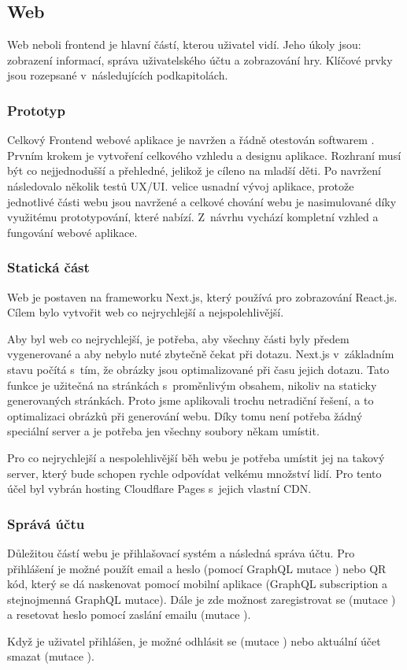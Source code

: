 \subsection{Web}
Web neboli frontend je hlavní částí, kterou uživatel vidí. Jeho úkoly jsou: zobrazení informací, správa uživatelského účtu a zobrazování hry. Klíčové prvky jsou rozepsané v~následujících podkapitolách.

\subsubsection{Prototyp}
Celkový Frontend webové aplikace je navržen a řádně otestován softwarem . Prvním krokem je vytvoření celkového vzhledu a designu aplikace. Rozhraní musí být co nejjednodušší a přehledné, jelikož je cíleno na mladší děti. Po navržení následovalo několik testů UX/UI.  velice usnadní vývoj aplikace, protože jednotlivé části webu jsou navržené a celkové chování webu je nasimulované díky využitému prototypování, které  nabízí. Z~návrhu vychází kompletní vzhled a fungování webové aplikace.

\subsubsection{Statická část}
Web je postaven na frameworku Next.js, který používá pro zobrazování React.js. Cílem bylo vytvořit web co nejrychlejší a nejspolehlivější.\par
Aby byl web co nejrychlejší, je potřeba, aby všechny části byly předem vygenerované a aby nebylo nuté zbytečně čekat při dotazu. Next.js v~základním stavu počítá s~tím, že obrázky jsou optimalizované při času jejich dotazu. Tato funkce je užitečná na stránkách s~proměnlivým obsahem, nikoliv na staticky generovaných stránkách. Proto jsme aplikovali trochu netradiční řešení, a to optimalizaci obrázků při generování webu. Díky tomu není potřeba žádný speciální server a je potřeba jen všechny soubory někam umístit.\par
Pro co nejrychlejší a nespolehlivější běh webu je potřeba umístit jej na takový server, který bude schopen rychle odpovídat velkému množství lidí. Pro tento účel byl vybrán hosting Cloudflare Pages\cite{Cloudflare-pages} s~jejich vlastní CDN\cite{Cloudflare-cdn}. 

\subsubsection{Správá účtu}
Důležitou částí webu je přihlašovací systém a následná správa účtu. Pro přihlášení je možné použít email a heslo (pomocí GraphQL mutace ) nebo QR kód, který se dá naskenovat pomocí mobilní aplikace (GraphQL subscription  a stejnojmenná GraphQL mutace). Dále je zde možnost zaregistrovat se (mutace ) a resetovat heslo pomocí zaslání emailu (mutace ).\par
Když je uživatel přihlášen, je možné odhlásit se (mutace ) nebo aktuální účet smazat (mutace ).

